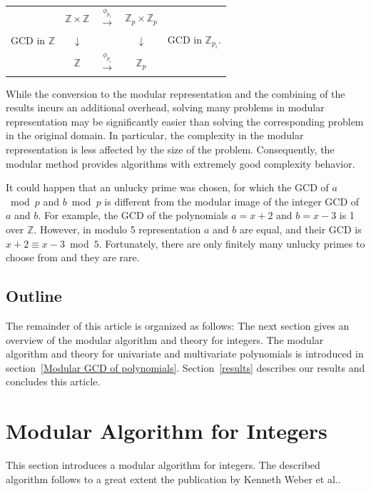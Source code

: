 \begin{table}[H]
\centering
\begin{tabular}[h]{rcccl}
& $\mathbb{Z} \times \mathbb{Z}$ & $\xrightarrow{\phi_{p_i}}$& $\mathbb{Z}_p \times \mathbb{Z}_p$ & \\
GCD in $\mathbb{Z}$ & $\downarrow$ &  & $\downarrow$ & GCD in $\mathbb{Z}_{p_i}.$ \\
& $\mathbb{Z}$ & $\xrightarrow{\phi_{p_i}}$ & $\mathbb{Z}_p$ & \\
\end{tabular}
\end{table}

\noindent While the conversion to the modular representation and the combining of the results incurs an additional overhead, solving many problems in modular representation may be significantly easier than solving the corresponding problem in the original domain. In particular, the complexity in the modular representation is less affected by the size of the problem. Consequently, the modular method provides algorithms with extremely good complexity behavior.

It could happen that an unlucky prime was chosen, for which the GCD of \mbox{$a$ mod $p$} and \mbox{$b$ mod $p$} is different from the modular image of the integer GCD of $a$ and $b$. For example, the GCD of the polynomials $a = x + 2$ and $b = x - 3$ is 1 over $\mathbb{Z}$. However, in modulo 5 representation $a$ and $b$ are equal, and their GCD is \mbox{$x + 2 \equiv x - 3$ mod $5$}. Fortunately, there are only finitely many unlucky primes to choose from and they are rare.

\subsection{Outline}

The remainder of this article is organized as follows:
The next section gives an overview of the modular algorithm and theory for integers.
The modular algorithm and theory for univariate and multivariate polynomials is introduced in section~\ref{Modular GCD of polynomials}.
Section~\ref{results} describes our results and concludes this article.

\section{Modular Algorithm for Integers}

This section introduces a modular algorithm for integers. The described algorithm follows to a great extent the publication by Kenneth Weber et al.\cite{modularInteger}.

